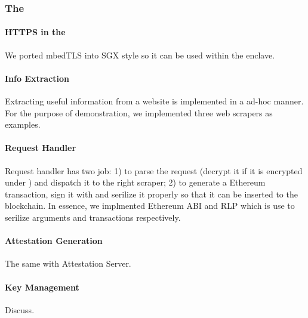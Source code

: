 \subsubsection{The \encname}

\paragraph{HTTPS in the \encname} We ported mbedTLS into SGX style so it can be used within the 
enclave.

\paragraph{Info Extraction} Extracting useful information from a website is implemented
in a ad-hoc manner. For the purpose of demonstration, we implemented three web scrapers
as examples. 

\paragraph{Request Handler} Request handler has two job: 1) to parse the request (decrypt it
if it is encrypted under \pkTC) and dispatch it to the right scraper; 2) to generate a 
Ethereum transaction, sign it with \pkTC and serilize it properly so that it can be
inserted to the blockchain. In essence, we implmented Ethereum ABI and RLP which is use to
serilize arguments and transactions respectively. 
\paragraph{Attestation Generation} The same with Attestation Server.
\paragraph{Key Management} Discuss.
